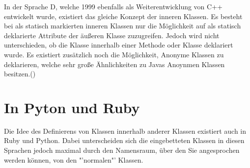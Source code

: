 In der Sprache D, welche 1999 ebenfalls als Weiterentwicklung von C++ entwickelt wurde, existiert das gleiche Konzept der inneren Klassen.
Es besteht bei als statisch markierten inneren Klassen nur die Möglichkeit auf als statisch deklarierte Attribute der äußeren Klasse zuzugreifen.
Jedoch wird nicht unterschieden, ob die Klasse innerhalb einer Methode oder Klasse deklariert wurde.
Es existiert zusätzlich noch die Möglichkeit, Anonyme Klassen zu deklarieren, welche sehr große Ähnlichkeiten zu Javas Anoynmen Klassen besitzen.(\cite{D:langSpec})

\section{In Pyton und Ruby}

Die Idee des Definierens von Klassen innerhalb anderer Klassen existiert auch in Ruby und Python.
Dabei unterscheiden sich die eingebetteten Klassen in diesen Sprachen jedoch maximal durch den Namensraum,
über den Sie angesprochen werden können, von den "'normalen"' Klassen.
